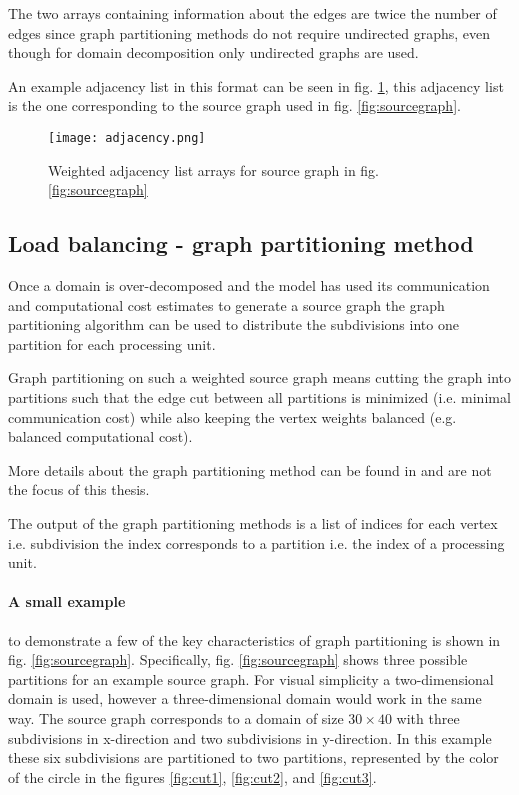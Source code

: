 The two arrays containing information about the edges are twice the number of edges since graph partitioning methods do not require undirected graphs, even though for domain decomposition only undirected graphs are used.

An example adjacency list in this format can be seen in fig. \ref{fig:adjacency}, this adjacency list is the one corresponding to the source graph used in fig. \ref{fig:sourcegraph}.

\begin{figure}[!htbp]
  \centering
  \texttt{[image: adjacency.png]}
  \caption{Weighted adjacency list arrays for source graph in fig. \ref{fig:sourcegraph}}
  \label{fig:adjacency}
\end{figure}

\subsection{Load balancing - graph partitioning method}
Once a domain is over-decomposed and the model has used its communication and computational cost estimates to generate a source graph the graph partitioning algorithm can be used to distribute the subdivisions into one partition for each processing unit.

Graph partitioning on such a weighted source graph means cutting the graph into partitions such that the edge cut between all partitions is minimized (i.e. minimal communication cost) while also keeping the vertex weights balanced (e.g. balanced computational cost).

More details about the graph partitioning method can be found in \citet{karypis1998multilevel} and are not the focus of this thesis.

The output of the graph partitioning methods is a list of indices for each vertex i.e. subdivision the index corresponds to a partition i.e. the index of a processing unit.

\paragraph{A small example}to demonstrate a few of the key characteristics of graph partitioning is shown in fig. \ref{fig:sourcegraph}.
Specifically, fig. \ref{fig:sourcegraph} shows three possible partitions for an example source graph.
For visual simplicity a two-dimensional domain is used, however a three-dimensional domain would work in the same way.
The source graph corresponds to a domain of size $30 \times 40$ with three subdivisions in x-direction and two subdivisions in y-direction.
In this example these six subdivisions are partitioned to two partitions, represented by the color of the circle in the figures \ref{fig:cut1}, \ref{fig:cut2}, and \ref{fig:cut3}.

